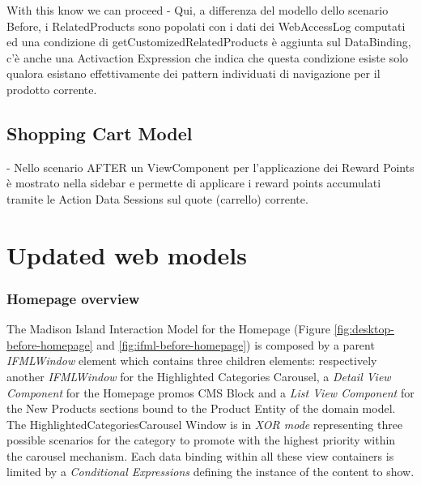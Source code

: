 With this know we can proceed 
- Qui, a differenza del modello dello scenario Before, i RelatedProducts sono popolati con i dati dei WebAccessLog computati ed una condizione di getCustomizedRelatedProducts è aggiunta sul DataBinding, c’è anche una Activaction Expression che indica che questa condizione esiste solo qualora esistano effettivamente dei pattern individuati di navigazione per il prodotto corrente.

\subsection{Shopping Cart Model}

- Nello scenario AFTER un ViewComponent per l’applicazione dei Reward Points è mostrato nella sidebar e permette di applicare i reward points accumulati tramite le Action Data Sessions sul quote (carrello) corrente.

\section{Updated web models}


\subsubsection{Homepage overview}

The Madison Island Interaction Model for the Homepage (Figure \ref{fig:desktop-before-homepage} and \ref{fig:ifml-before-homepage}) is composed by a parent \textit{IFMLWindow} element which contains three children elements: respectively another \textit{IFMLWindow} for the Highlighted Categories Carousel, a \textit{Detail View Component} for the Homepage promos CMS Block and a \textit{List View Component} for the New Products sections bound to the Product Entity of the domain model. The HighlightedCategoriesCarousel Window is in \textit{XOR mode} representing three possible scenarios for the category to promote with the highest priority within the carousel mechanism. Each data binding within all these view containers is limited by a \textit{Conditional Expressions} defining the instance of the content to show.

